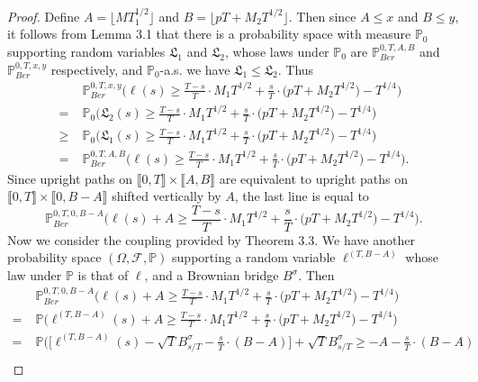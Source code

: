 \documentclass[12pt]{article}
\begin{document}
	\begin{proof}
		
		Define $A = \lfloor MT_1^{1/2}\rfloor$ and $B = \lfloor pT + M_2 T^{1/2}\rfloor$. Then since $A\leq x$ and $B\leq y$, it follows from Lemma 3.1 that there is a probability space with measure $\mathbb{P}_0$ supporting random variables $\mathfrak{L}_1$ and $\mathfrak{L}_2$, whose laws under $\mathbb{P}_0$ are $\mathbb{P}^{0,T,A,B}_{Ber}$ and $\mathbb{P}^{0,T,x,y}_{Ber}$ respectively, and $\mathbb{P}_0$-a.s. we have $\mathfrak{L}_1\leq \mathfrak{L}_2$. Thus
		\begin{align*}
		&\mathbb{P}^{0,T,x,y}_{Ber}\Big( \ell(s)  \geq \frac{T-s}{T} \cdot M_1 T^{1/2} + \frac{s}{T} \cdot \big(p T + M_2 T^{1/2}\big) - T^{1/4} \Big)\\
		= \; & \mathbb{P}_0\Big( \mathfrak{L}_2(s)  \geq \frac{T-s}{T} \cdot M_1 T^{1/2} + \frac{s}{T} \cdot \big(p T + M_2 T^{1/2}\big) - T^{1/4} \Big)\\
		\geq \; & \mathbb{P}_0\Big( \mathfrak{L}_1(s)  \geq \frac{T-s}{T} \cdot M_1 T^{1/2} + \frac{s}{T} \cdot \big(p T + M_2 T^{1/2}\big) - T^{1/4} \Big)\\
		= \; & \mathbb{P}^{0,T,A,B}_{Ber}\Big( \ell(s)  \geq \frac{T-s}{T} \cdot M_1 T^{1/2} + \frac{s}{T} \cdot \big(p T + M_2 T^{1/2}\big) - T^{1/4} \Big).
		\end{align*}
		Since upright paths on $\llbracket 0,T\rrbracket \times \llbracket A,B\rrbracket$ are equivalent to upright paths on $\llbracket 0,T\rrbracket \times \llbracket 0, B-A\rrbracket$ shifted vertically by $A$, the last line is equal to
		\[
		\mathbb{P}^{0,T,0,B-A}_{Ber}\Big( \ell(s) + A  \geq \frac{T-s}{T} \cdot M_1 T^{1/2} + \frac{s}{T} \cdot \big(p T + M_2 T^{1/2}\big) - T^{1/4} \Big).
		\]
		Now we consider the coupling provided by Theorem 3.3. We have another probability space $(\Omega,\mathcal{F},\mathbb{P})$ supporting a random variable $\ell^{(T,B-A)}$ whose law under $\mathbb{P}$ is that of $\ell$, and a Brownian bridge $B^\sigma$. Then 
		\begin{align*}
		&\mathbb{P}^{0,T,0,B-A}_{Ber}\Big( \ell(s) + A  \geq \frac{T-s}{T} \cdot M_1 T^{1/2} + \frac{s}{T} \cdot \big(p T + M_2 T^{1/2}\big) - T^{1/4} \Big)\\
		= \; & \mathbb{P}\Big( \ell^{(T,B-A)}(s) + A \geq \frac{T-s}{T} \cdot M_1 T^{1/2} + \frac{s}{T} \cdot \big(p T + M_2 T^{1/2}\big) - T^{1/4} \Big)\\
		= \; & \mathbb{P}\Big( \Big[\ell^{(T,B-A)}(s) - \sqrt{T} B^\sigma_{s/T} - \frac{s}{T}\cdot(B-A)\Big] + \sqrt{T}B^\sigma_{s/T} \geq -A-\frac{s}{T}\cdot(B-A) \\

\end{align*}
\end{proof}
\end{document}
